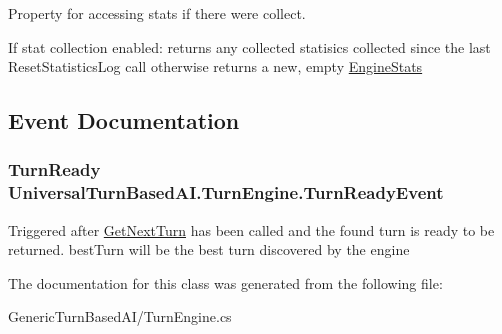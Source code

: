 Property for accessing stats if there were collect. 

If stat collection enabled\+: returns any collected statisics collected since the last Reset\+Statistics\+Log call otherwise returns a new, empty \hyperlink{class_universal_turn_based_a_i_1_1_engine_stats}{Engine\+Stats}

\subsection{Event Documentation}
\hypertarget{class_universal_turn_based_a_i_1_1_turn_engine_af10115494121382d2966a8fc9fe4c9a0}{}
\subsubsection[{Turn\+Ready\+Event}]{\setlength{\rightskip}{0pt plus 5cm}Turn\+Ready Universal\+Turn\+Based\+A\+I.\+Turn\+Engine.\+Turn\+Ready\+Event}\label{class_universal_turn_based_a_i_1_1_turn_engine_af10115494121382d2966a8fc9fe4c9a0}


Triggered after \hyperlink{class_universal_turn_based_a_i_1_1_turn_engine_ad1a07e70064e2f188b65a783aa49cd8a}{Get\+Next\+Turn} has been called and the found turn is ready to be returned. best\+Turn will be the best turn discovered by the engine 



The documentation for this class was generated from the following file\+:\begin{DoxyCompactItemize}
\item 
Generic\+Turn\+Based\+A\+I/Turn\+Engine.\+cs\end{DoxyCompactItemize}
